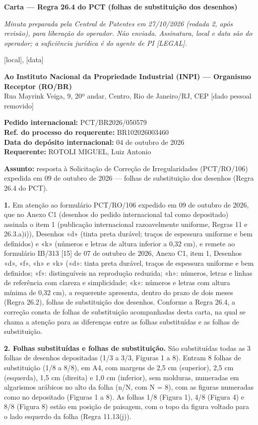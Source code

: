 \documentclass[a4paper,11pt]{article}
\begin{document}
\begin{center}{\large\bfseries Carta --- Regra 26.4 do PCT (folhas de substituição dos desenhos)}\end{center}

{\small\itshape Minuta preparada pela Central de Patentes em 27/10/2026 (rodada 2, após revisão), para liberação do operador. Não enviada. Assinatura, local e data são do operador; a suficiência jurídica é do agente de PI [LEGAL].}

[local], [data]

\textbf{Ao Instituto Nacional da Propriedade Industrial (INPI) --- Organismo Receptor (RO/BR)}\\ Rua Mayrink Veiga, 9, 20º andar, Centro, Rio de Janeiro/RJ, CEP [dado pessoal removido]

\textbf{Pedido internacional:} PCT/BR2026/050579\\ \textbf{Ref. do processo do requerente:} BR102026003460\\ \textbf{Data do depósito internacional:} 04 de outubro de 2026\\ \textbf{Requerente:} ROTOLI MIGUEL, Luiz Antonio

\textbf{Assunto:} resposta à Solicitação de Correção de Irregularidades (PCT/RO/106) expedida em 09 de outubro de 2026 --- folhas de substituição dos desenhos (Regra 26.4 do PCT).

\textbf{1.} Em atenção ao formulário PCT/RO/106 expedido em 09 de outubro de 2026, que no Anexo C1 (desenhos do pedido internacional tal como depositado) assinala o item 1 (publicação internacional razoavelmente uniforme, Regras 11 e 26.3.a)i)), Desenhos «d» (tinta preta durável; traços de espessura uniforme e bem definidos) e «k» (números e letras de altura inferior a 0,32 cm), e remete ao formulário IB/313 [15] de 07 de outubro de 2026, Anexo C1, item 1, Desenhos «d», «f», «h» e «k» («d»: tinta preta durável, traços de espessura uniforme e bem definidos; «f»: distinguíveis na reprodução reduzida; «h»: números, letras e linhas de referência com clareza e simplicidade; «k»: números e letras com altura mínima de 0,32 cm), a requerente apresenta, dentro do prazo de dois meses (Regra 26.2), folhas de substituição dos desenhos. Conforme a Regra 26.4, a correção consta de folhas de substituição acompanhadas desta carta, na qual se chama a atenção para as diferenças entre as folhas substituídas e as folhas de substituição.

\textbf{2. Folhas substituídas e folhas de substituição.} São substituídas todas as 3 folhas de desenhos depositadas (1/3 a 3/3, Figuras 1 a 8). Entram 8 folhas de substituição (1/8 a 8/8), em A4, com margens de 2,5 cm (superior), 2,5 cm (esquerda), 1,5 cm (direita) e 1,0 cm (inferior), sem molduras, numeradas em algarismos arábicos no alto da folha (n/N, com N = 8), com as figuras numeradas como no depositado (Figuras 1 a 8). As folhas 1/8 (Figura 1), 4/8 (Figura 4) e 8/8 (Figura 8) estão em posição de paisagem, com o topo da figura voltado para o lado esquerdo da folha (Regra 11.13(j)).
\end{document}
